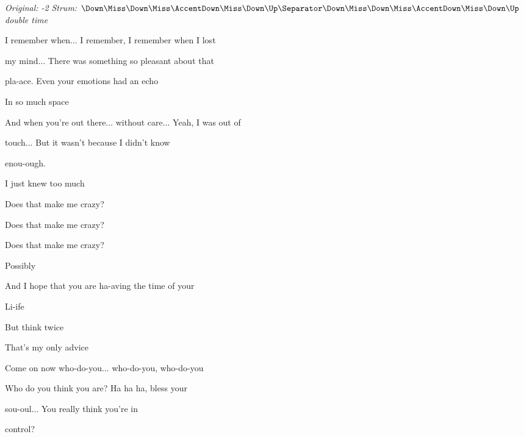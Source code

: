 \begin{song}


\begin{headerbox}
\RaiseBoxWithAccents
\textit{Original: -2} \quad
\textit{Strum:} $\Down\Miss\Down\Miss\AccentDown\Miss\Down\Up \Separator \Down\Miss\Down\Miss\AccentDown\Miss\Down\Up$ \textit{double time}
\end{headerbox}


\begin{vchordbox}
\end{vchordbox}

\bigskip

 I remember when... I remember, I remember when I lost \par
my mind... There was something so pleasant about that \par
pla-ace. Even your emotions had an echo \par
In so much space  \par

\bigskip

 And when you're out there... without care... Yeah, I was out of \par
{}touch... But it wasn't because I didn't know \par
enou-ough.  \par
I just knew too much  \par

\bigskip

Does that make me crazy? \par
Does that make me crazy? \par
Does that make me crazy? \par
Possibly  \par

\bigskip

 And I hope that you are ha-aving the time of your \par
{}Li-ife  \par
But think twice  \par
That's my only advice  \par

\bigskip

 Come on now who-do-you... who-do-you, who-do-you \par
Who do you think you are? Ha ha ha, bless your \par
sou-oul...  You really think you're in \par
control?  \par


\end{song}

